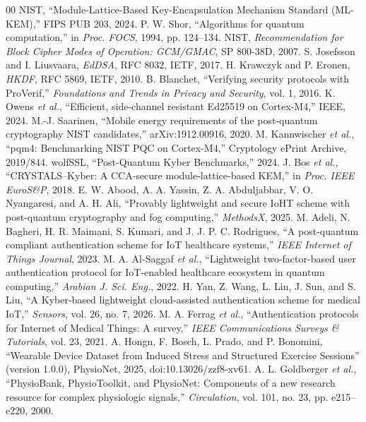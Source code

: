 \documentclass[conference]{IEEEtran}
\begin{document}
\begin{thebibliography}{00}
 NIST, ``Module-Lattice-Based Key-Encapsulation Mechanism Standard (ML-KEM),'' FIPS PUB 203, 2024.
 P. W. Shor, ``Algorithms for quantum computation,'' in \emph{Proc. FOCS}, 1994, pp. 124--134.
 NIST, \emph{Recommendation for Block Cipher Modes of Operation: GCM/GMAC}, SP 800-38D, 2007.
 S. Josefsson and I. Liusvaara, \emph{EdDSA}, RFC 8032, IETF, 2017.
 H. Krawczyk and P. Eronen, \emph{HKDF}, RFC 5869, IETF, 2010.
 B. Blanchet, ``Verifying security protocols with ProVerif,'' \emph{Foundations and Trends in Privacy and Security}, vol. 1, 2016.
 K. Owens \emph{et al.}, ``Efficient, side-channel resistant Ed25519 on Cortex-M4,'' IEEE, 2024.
 M.-J. Saarinen, ``Mobile energy requirements of the post-quantum cryptography NIST candidates,'' arXiv:1912.00916, 2020.
 M. Kannwischer \emph{et al.}, ``pqm4: Benchmarking NIST PQC on Cortex-M4,'' Cryptology ePrint Archive, 2019/844.
 wolfSSL, ``Post-Quantum Kyber Benchmarks,'' 2024.
 J. Bos \emph{et al.}, ``CRYSTALS--Kyber: A CCA-secure module-lattice-based KEM,'' in \emph{Proc. IEEE EuroS\&P}, 2018.
 E. W. Abood, A. A. Yassin, Z. A. Abduljabbar, V. O. Nyangaresi, and A. H. Ali, ``Provably lightweight and secure IoHT scheme with post-quantum cryptography and fog computing,'' \emph{MethodsX}, 2025.
 M. Adeli, N. Bagheri, H. R. Maimani, S. Kumari, and J. J. P. C. Rodrigues, ``A post-quantum compliant authentication scheme for IoT healthcare systems,'' \emph{IEEE Internet of Things Journal}, 2023.
 M. A. Al-Saggaf \emph{et al.}, ``Lightweight two-factor-based user authentication protocol for IoT-enabled healthcare ecosystem in quantum computing,'' \emph{Arabian J. Sci. Eng.}, 2022.
 H. Yan, Z. Wang, L. Lin, J. Sun, and S. Liu, ``A Kyber-based lightweight cloud-assisted authentication scheme for medical IoT,'' \emph{Sensors}, vol. 26, no. 7, 2026.
 M. A. Ferrag \emph{et al.}, ``Authentication protocols for Internet of Medical Things: A survey,'' \emph{IEEE Communications Surveys \& Tutorials}, vol. 23, 2021.
 A. Hongn, F. Bosch, L. Prado, and P. Bonomini, ``Wearable Device Dataset from Induced Stress and Structured Exercise Sessions'' (version 1.0.0), PhysioNet, 2025, doi:10.13026/zzf8-xv61.
 A. L. Goldberger \emph{et al.}, ``PhysioBank, PhysioToolkit, and PhysioNet: Components of a new research resource for complex physiologic signals,'' \emph{Circulation}, vol. 101, no. 23, pp. e215--e220, 2000.
\end{thebibliography}
\end{document}
